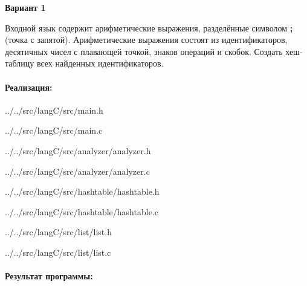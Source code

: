 \newpage

\textbf{Вариант 1}

Входной язык содержит арифметические выражения, разделённые символом \textbf{;} (точка с запятой).
Арифметические выражения состоят из идентификаторов, десятичных чисел с плавающей точкой, знаков операций и скобок.
Создать хеш-таблицу всех найденных идентификаторов.


\paragraph{Реализация:} \hspace{0pt}



{../../src/langC/src/main.h}


{../../src/langC/src/main.c}



{../../src/langC/src/analyzer/analyzer.h}


{../../src/langC/src/analyzer/analyzer.c}



{../../src/langC/src/hashtable/hashtable.h}


{../../src/langC/src/hashtable/hashtable.c}



{../../src/langC/src/list/list.h}


{../../src/langC/src/list/list.c}


\paragraph{Результат программы:} \hspace{0pt}

